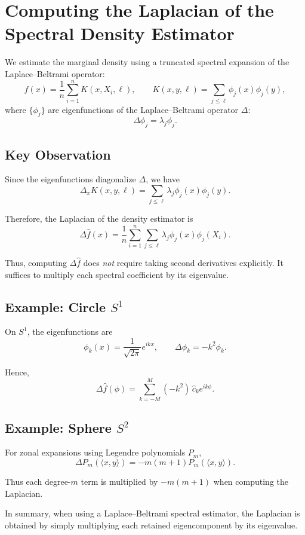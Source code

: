 \section*{Computing the Laplacian of the Spectral Density Estimator}

We estimate the marginal density using a truncated spectral expansion of the Laplace--Beltrami operator:
\[
\hat f(x)
=
\frac{1}{n}\sum_{i=1}^n K(x,X_i,\ell),
\qquad
K(x,y,\ell)
=
\sum_{j\le \ell} \phi_j(x)\phi_j(y),
\]
where $\{\phi_j\}$ are eigenfunctions of the Laplace--Beltrami operator $\Delta$:
\[
\Delta \phi_j = \lambda_j \phi_j.
\]

\subsection*{Key Observation}

Since the eigenfunctions diagonalize $\Delta$, we have
\[
\Delta_x K(x,y,\ell)
=
\sum_{j\le \ell} \lambda_j \phi_j(x)\phi_j(y).
\]

Therefore, the Laplacian of the density estimator is
\[
\boxed{
\Delta \hat f(x)
=
\frac{1}{n}
\sum_{i=1}^n
\sum_{j\le \ell}
\lambda_j \phi_j(x)\phi_j(X_i).
}
\]

Thus, computing $\Delta \hat f$ does \emph{not} require taking second derivatives explicitly.  
It suffices to multiply each spectral coefficient by its eigenvalue.

\subsection*{Example: Circle $S^1$}

On $S^1$, the eigenfunctions are
\[
\phi_k(x)=\frac{1}{\sqrt{2\pi}}e^{ikx},
\qquad
\Delta \phi_k = -k^2 \phi_k.
\]

Hence,
\[
\Delta \hat f(\phi)
=
\sum_{k=-M}^{M} (-k^2)\,\hat c_k e^{ik\phi}.
\]

\subsection*{Example: Sphere $S^2$}

For zonal expansions using Legendre polynomials $P_m$,
\[
\Delta P_m(\langle x,y\rangle)
=
- m(m+1) P_m(\langle x,y\rangle).
\]

Thus each degree-$m$ term is multiplied by $-m(m+1)$ when computing the Laplacian.

\bigskip

\noindent
In summary, when using a Laplace--Beltrami spectral estimator, the Laplacian is obtained by simply multiplying each retained eigencomponent by its eigenvalue.